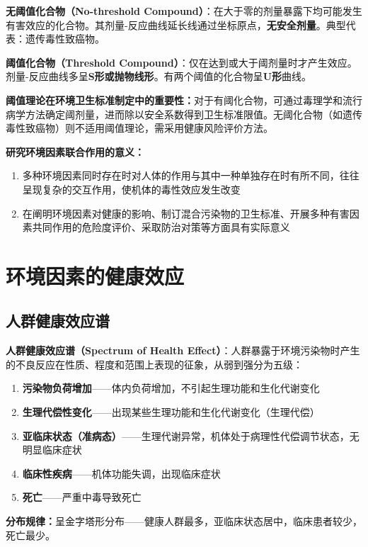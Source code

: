 \documentclass[10pt,a4paper,oneside]{ctexbook}
\begin{document}
\begin{defbox}
\textbf{无阈值化合物（No-threshold Compound）}：在大于零的剂量暴露下均可能发生有害效应的化合物。其剂量-反应曲线延长线通过坐标原点，\textbf{无安全剂量}。典型代表：遗传毒性致癌物。

\textbf{阈值化合物（Threshold Compound）}：仅在达到或大于阈剂量时才产生效应。剂量-反应曲线多呈\textbf{S形或抛物线形}。有两个阈值的化合物呈\textbf{U形}曲线。
\end{defbox}

\begin{keybox}
\textbf{阈值理论在环境卫生标准制定中的重要性：}对于有阈化合物，可通过毒理学和流行病学方法确定阈剂量，进而除以安全系数得到卫生标准限值。无阈化合物（如遗传毒性致癌物）则不适用阈值理论，需采用健康风险评价方法。
\end{keybox}

\begin{tipbox}
\textbf{研究环境因素联合作用的意义：}
\begin{enumerate}[leftmargin=*]
    \item 多种环境因素同时存在时对人体的作用与其中一种单独存在时有所不同，往往呈现复杂的交互作用，使机体的毒性效应发生改变
    \item 在阐明环境因素对健康的影响、制订混合污染物的卫生标准、开展多种有害因素共同作用的危险度评价、采取防治对策等方面具有实际意义
\end{enumerate}
\end{tipbox}

\section{环境因素的健康效应}

\subsection{人群健康效应谱}

\begin{keybox}
\textbf{人群健康效应谱（Spectrum of Health Effect）}：人群暴露于环境污染物时产生的不良反应在性质、程度和范围上表现的征象，从弱到强分为五级：

\begin{enumerate}[leftmargin=*]
    \item \textbf{污染物负荷增加}——体内负荷增加，不引起生理功能和生化代谢变化
    \item \textbf{生理代偿性变化}——出现某些生理功能和生化代谢变化（生理代偿）
    \item \textbf{亚临床状态（准病态）}——生理代谢异常，机体处于病理性代偿调节状态，无明显临床症状
    \item \textbf{临床性疾病}——机体功能失调，出现临床症状
    \item \textbf{死亡}——严重中毒导致死亡
\end{enumerate}

\textbf{分布规律：}呈金字塔形分布——健康人群最多，亚临床状态居中，临床患者较少，死亡最少。
\end{keybox}
\end{document}
